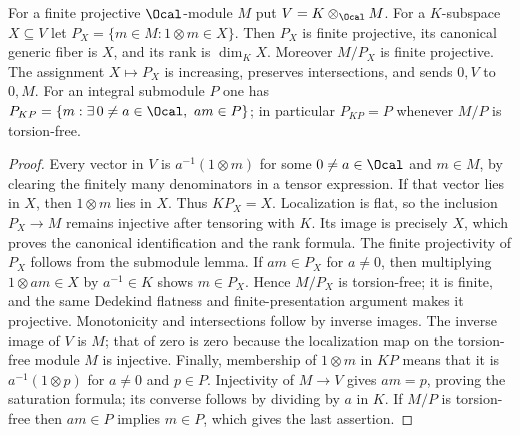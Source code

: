 \begin{lemma}
\label{lem:integral-part-generic-subspace}
\leanok
For a finite projective $\Ocal$-module $M$ put $V=K\otimes_\Ocal M$.
For a $K$-subspace $X\subseteq V$ let
$P_X=\{m\in M:1\otimes m\in X\}$. Then $P_X$ is finite projective,
its canonical generic fiber is $X$, and its rank is $\dim_K X$.
Moreover $M/P_X$ is finite projective. The assignment $X\mapsto P_X$
is increasing, preserves intersections, and sends $0,V$ to $0,M$.
For an integral submodule $P$ one has
$P_{KP}=\{m:\exists\,0\ne a\in\Ocal,\ am\in P\}$; in particular
$P_{KP}=P$ whenever $M/P$ is torsion-free.
\end{lemma}
\begin{proof}
Every vector in $V$ is $a^{-1}(1\otimes m)$ for some $0\ne a\in\Ocal$
and $m\in M$, by clearing the finitely many denominators in a tensor
expression. If that vector lies in $X$, then $1\otimes m$ lies in $X$.
Thus $K P_X=X$. Localization is flat, so the inclusion $P_X\to M$
remains injective after tensoring with $K$. Its image is precisely $X$,
which proves the canonical identification and the rank formula.
The finite projectivity of $P_X$ follows from the submodule lemma.
If $a m\in P_X$ for $a\ne0$, then multiplying $1\otimes am\in X$
by $a^{-1}\in K$ shows $m\in P_X$. Hence $M/P_X$ is torsion-free;
it is finite, and the same Dedekind flatness and finite-presentation
argument makes it projective. Monotonicity and intersections follow by
inverse images. The inverse image of $V$ is $M$; that of zero is zero
because the localization map on the torsion-free module $M$ is injective.
Finally, membership of $1\otimes m$ in $KP$ means that it is
$a^{-1}(1\otimes p)$ for $a\ne0$ and $p\in P$. Injectivity of
$M\to V$ gives $am=p$, proving the saturation formula; its converse
follows by dividing by $a$ in $K$. If $M/P$ is torsion-free then
$am\in P$ implies $m\in P$, which gives the last assertion.
\end{proof}

